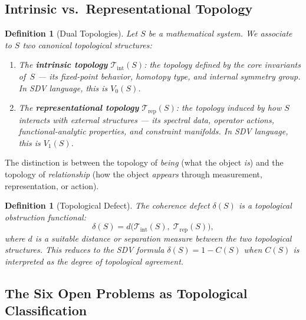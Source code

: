 \documentclass[11pt]{article}
\newtheorem{definition}[theorem]{Definition}
\begin{document}
\subsection{Intrinsic vs.\ Representational Topology}
\label{subsec:two-topologies}

\begin{definition}[Dual Topologies]
\label{def:dual-topo}
Let $S$ be a mathematical system.  We associate to $S$ two canonical
topological structures:
\begin{enumerate}
\item The \textbf{intrinsic topology} $\mathcal{T}_{\mathrm{int}}(S)$:
the topology defined by the core invariants of~$S$ --- its fixed-point
behavior, homotopy type, and internal symmetry group.  In SDV language,
this is $V_0(S)$.
\item The \textbf{representational topology} $\mathcal{T}_{\mathrm{rep}}(S)$:
the topology induced by how $S$ interacts with external structures ---
its spectral data, operator actions, functional-analytic properties,
and constraint manifolds.  In SDV language, this is $V_1(S)$.
\end{enumerate}
\end{definition}

\noindent
The distinction is between the topology of \emph{being} (what the object
\emph{is}) and the topology of \emph{relationship} (how the object
\emph{appears} through measurement, representation, or action).

\begin{definition}[Topological Defect]
The coherence defect $\delta(S)$ is a topological obstruction functional:
\[
  \delta(S) = d\bigl(\mathcal{T}_{\mathrm{int}}(S),\;
  \mathcal{T}_{\mathrm{rep}}(S)\bigr),
\]
where $d$ is a suitable distance or separation measure between the two
topological structures.  This reduces to the SDV formula
$\delta(S) = 1 - C(S)$ when $C(S)$ is interpreted as the degree of
topological agreement.
\end{definition}

\subsection{The Six Open Problems as Topological Classification}
\label{subsec:topo-classification}
\end{document}
